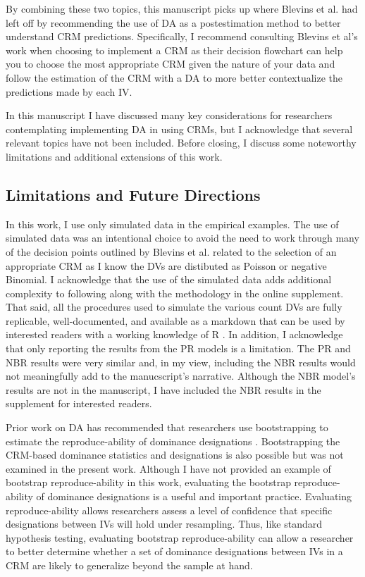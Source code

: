 \documentclass[man]{apa7}
\begin{document}
	By combining these two topics, this manuscript picks up where Blevins et al. \parencite*{blevins2015count} had left off by recommending the use of DA as a postestimation method to better understand CRM predictions.
	Specifically, I recommend consulting Blevins et al's work when choosing to implement a CRM as their decision flowchart can help you to choose the most appropriate CRM given the nature of your data and follow the estimation of the CRM with a DA to more better contextualize the predictions made by each IV.
	
	In this manuscript I have discussed many key considerations for researchers contemplating implementing DA in using CRMs, but I acknowledge that several relevant topics have not been included.
	Before closing, I discuss some noteworthy limitations and additional extensions of this work.
	
	\subsection{Limitations and Future Directions}
	
	In this work, I use only simulated data in the empirical examples.
	The use of simulated data was an intentional choice to avoid the need to work through many of the decision points outlined by Blevins et al. \parencite*{blevins2015count} related to the selection of an appropriate CRM as I know the DVs are distibuted as Poisson or negative Binomial.
	I acknowledge that the use of the simulated data adds additional complexity to following along with the methodology in the online supplement.
	That said, all the procedures used to simulate the various count DVs are fully replicable, well-documented, and available as a markdown that can be used by interested readers with a working knowledge of R \parencite{R}.
	In addition, I acknowledge that only reporting the results from the PR models is a limitation.
	The PR and NBR results were very similar and, in my view, including the NBR results would not meaningfully add to the manucscript's narrative.
	Although the NBR model's results are not in the manuscript, I have included the NBR results in the supplement for interested readers.
	
	Prior work on DA has recommended that researchers use bootstrapping to estimate the reproduce-ability of dominance designations \parencite{azen2003dominance}. 
	Bootstrapping the CRM-based dominance statistics and designations is also possible but was not examined in the present work.
	Although I have not provided an example of bootstrap reproduce-ability in this work, evaluating the bootstrap reproduce-ability of dominance designations is a useful and important practice.
	Evaluating reproduce-ability allows researchers assess a level of confidence that specific designations between IVs will hold under resampling.
	Thus, like standard hypothesis testing, evaluating bootstrap reproduce-ability can allow a researcher to better determine whether a set of dominance designations between IVs in a CRM are likely to generalize beyond the sample at hand.
	
\end{document}
